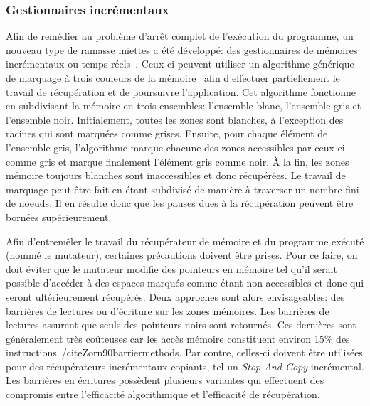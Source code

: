\documentclass[12pt,twoside,letterpaper,francais]{book}
\begin{document}
\FloatBarrier
\subsubsection{Gestionnaires incrémentaux}
Afin de remédier au problème d'arrêt complet de l'exécution du
programme, un nouveau type de ramasse miettes a été développé: des
gestionnaires de mémoires incrémentaux ou temps
réels~\cite{INCR_BAKER}. Ceux-ci peuvent utiliser un algorithme
générique de marquage à trois couleurs de la
mémoire~\cite{dijkstra-tricolour} afin d'effectuer partiellement le
travail de récupération et de poursuivre l'application. Cet algorithme
fonctionne en subdivisant la mémoire en trois ensembles: l'ensemble
blanc, l'ensemble gris et l'ensemble noir. Initialement, toutes les
zones sont blanches, à l'exception des racines qui sont marquées comme
grises. Ensuite, pour chaque élément de l'ensemble gris, l'algorithme
marque chacune des zones accessibles par ceux-ci comme gris et marque
finalement l'élément gris comme noir. À la fin, les zones mémoire
toujours blanches sont inaccessibles et donc récupérées.  Le travail
de marquage peut être fait en étant subdivisé de manière à traverser
un nombre fini de noeuds. Il en résulte donc que les pauses dues à la
récupération peuvent être bornées supérieurement.

Afin d'entremêler le travail du récupérateur de mémoire et du
programme exécuté (nommé le mutateur), certaines précautions doivent
être prises. Pour ce faire, on doit éviter que le mutateur modifie des
pointeurs en mémoire tel qu'il serait possible d'accéder à des espaces
marqués comme étant non-accessibles et donc qui seront ultérieurement
récupérés. Deux approches sont alors envisageables: des barrières de
lectures ou d'écriture sur les zones mémoires. Les barrières de
lectures assurent que seuls des pointeurs noirs sont retournés. Ces
dernières sont généralement très coûteuses car les accès mémoire
constituent environ 15\% des
instructions~/cite{Zorn90barriermethods}. Par contre, celles-ci
doivent être utilisées pour des récupérateurs incrémentaux copiants,
tel un \textit{Stop And Copy} incrémental. Les barrières en écritures
possèdent plusieurs variantes qui effectuent des compromis entre
l'efficacité algorithmique et l'efficacité de récupération.


\FloatBarrier
\end{document}
